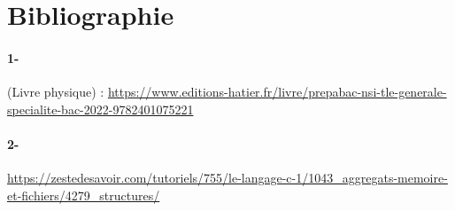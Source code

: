 \documentclass[a4paper, 12pt]{article}
\begin{document}
\appendix  %
\section{Bibliographie}
\paragraph{1- }
(Livre physique) : \url{https://www.editions-hatier.fr/livre/prepabac-nsi-tle-generale-specialite-bac-2022-9782401075221}
\paragraph{2- }
\url{https://zestedesavoir.com/tutoriels/755/le-langage-c-1/1043_aggregats-memoire-et-fichiers/4279_structures/}
\end{document}
